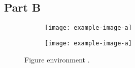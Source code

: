 \subsection{Part B}
\begin{figure}[h!tbp]
    \centering
    \begin{subfigure}[b]{0.45\linewidth}
        \centering
        \texttt{[image: example-image-a]}
    \end{subfigure}
    \begin{subfigure}[b]{0.45\linewidth}
        \centering
        \texttt{[image: example-image-a]}
    \end{subfigure}
    \caption{Figure environment \cite{galvez_MachinelearningDataSet_2019}.}
    \label{fig:p2_a}
\end{figure}
\begin{theorem}[test]
    \lipsum[2]
\end{theorem}
%
\lipsum[34]
\begin{eg}[test]
    \lipsum[36]
\end{eg}